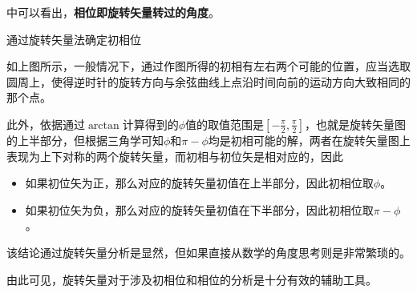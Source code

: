 中可以看出，\textbf{相位即旋转矢量转过的角度}。
\begin{Figure}{通过旋转矢量法确定初相位}
    \qquad
\end{Figure}
如上图所示，一般情况下，通过作图所得的初相有左右两个可能的位置，应当选取圆周上，使得逆时针的旋转方向与余弦曲线上点沿时间向前的运动方向大致相同的那个点。

此外，依据通过$\arctan$计算得到的$\phi$值的取值范围是$[-\frac{\pi}{2},\frac{\pi}{2}]$，也就是旋转矢量图的上半部分，但根据三角学可知$\phi$和$\pi-\phi$均是初相可能的解，两者在旋转矢量图上表现为上下对称的两个旋转矢量，而初相与初位矢是相对应的，因此
\begin{itemize}
    \item 如果初位矢为正，那么对应的旋转矢量初值在上半部分，因此初相位取$\phi$。
    \item 如果初位矢为负，那么对应的旋转矢量初值在下半部分，因此初相位取$\pi-\phi$。
\end{itemize}
该结论通过旋转矢量分析是显然，但如果直接从数学的角度思考则是非常繁琐的。

由此可见，旋转矢量对于涉及初相位和相位的分析是十分有效的辅助工具。